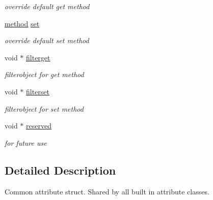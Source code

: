 \begin{DoxyCompactItemize}
\begin{DoxyCompactList}\small\item\em override default get method \item\end{DoxyCompactList}\item 
\hypertarget{structt__jit__attr_ac704152cb5f603f27eb432a5a7777763}{
\hyperlink{group__datatypes_gac26ba0a173b50597f5738132e059b42d}{method} \hyperlink{structt__jit__attr_ac704152cb5f603f27eb432a5a7777763}{set}}
\label{structt__jit__attr_ac704152cb5f603f27eb432a5a7777763}

\begin{DoxyCompactList}\small\item\em override default set method \item\end{DoxyCompactList}\item 
\hypertarget{structt__jit__attr_a895dc10f0c8a79abdfbf6641172e74d7}{
void $\ast$ \hyperlink{structt__jit__attr_a895dc10f0c8a79abdfbf6641172e74d7}{filterget}}
\label{structt__jit__attr_a895dc10f0c8a79abdfbf6641172e74d7}

\begin{DoxyCompactList}\small\item\em filterobject for get method \item\end{DoxyCompactList}\item 
\hypertarget{structt__jit__attr_ab9a0dec949526649b53351a0f7630d50}{
void $\ast$ \hyperlink{structt__jit__attr_ab9a0dec949526649b53351a0f7630d50}{filterset}}
\label{structt__jit__attr_ab9a0dec949526649b53351a0f7630d50}

\begin{DoxyCompactList}\small\item\em filterobject for set method \item\end{DoxyCompactList}\item 
\hypertarget{structt__jit__attr_a9f7eae811b0e2084a948bee6cf507f7c}{
void $\ast$ \hyperlink{structt__jit__attr_a9f7eae811b0e2084a948bee6cf507f7c}{reserved}}
\label{structt__jit__attr_a9f7eae811b0e2084a948bee6cf507f7c}

\begin{DoxyCompactList}\small\item\em for future use \item\end{DoxyCompactList}\end{DoxyCompactItemize}


\subsection{Detailed Description}
Common attribute struct. Shared by all built in attribute classes. 